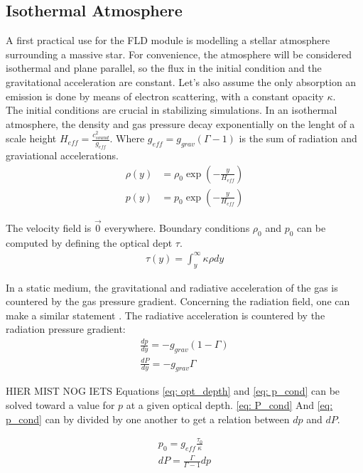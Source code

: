 \subsection{Isothermal Atmosphere}
A first practical use for the FLD module is modelling a stellar atmosphere surrounding a massive star. For convenience, the atmosphere will be considered isothermal and plane parallel, so the flux in the initial condition and the gravitational acceleration are constant. Let's also assume the only absorption an emission is done by means of electron scattering, with a constant opacity $\kappa$.\\

The initial conditions are crucial in stabilizing simulations. In an isothermal atmosphere, the density and gas pressure decay exponentially on the lenght of a scale height $H_{eff} = \frac{c_{sound}^2}{g_{eff}}$. Where $g_{eff} = g_{grav}(\Gamma - 1)$ is the sum of radiation and graviational accelerations. 
\begin{align}
\rho(y) &= \rho_0 \exp \left( -\frac{y}{H_{eff}} \right) \\
 p(y)   &= p_0    \exp \left( -\frac{y}{H_{eff}} \right)
\end{align}

The velocity field is $\vec{0}$ everywhere. Boundary conditions $\rho_0$ and $p_0$ can be computed by defining the optical dept $\tau$. 
\begin{align}
\tau(y) = \int^\infty_{y} \kappa \rho dy  \label{eq: opt_depth}
\end{align}

In a static medium, the gravitational and radiative acceleration of the gas is countered by the gas pressure gradient. Concerning the radiation field, one can make a similar statement . The radiative acceleration is countered by the radiation pressure gradient:
\begin{align}
\frac{dp}{dy} = -g_{grav}(1 - \Gamma) \label{eq: p_cond} \\
\frac{dP}{dy} = -g_{grav} \Gamma \label{eq: P_cond}
\end{align}

HIER MIST NOG IETS
Equations \eqref{eq: opt_depth} and \eqref{eq: p_cond} can be solved toward a value for $p$ at a given optical depth. \eqref{eq: P_cond} And \eqref{eq: p_cond} can by divided by one another to get a relation between $dp$ and $dP$.

\begin{align}
p_0 = g_{eff} \frac{\tau_0}{\kappa} \\
dP = \frac{\Gamma}{\Gamma-1} dp
\end{align}


